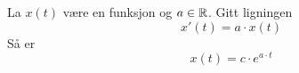 La $x(t)$ være en funksjon og $a \in \mathbb{R}$.
Gitt ligningen
$$x'(t) = a\cdot x(t)$$
Så er
$$x(t) = c\cdot e^{a\cdot t}$$
